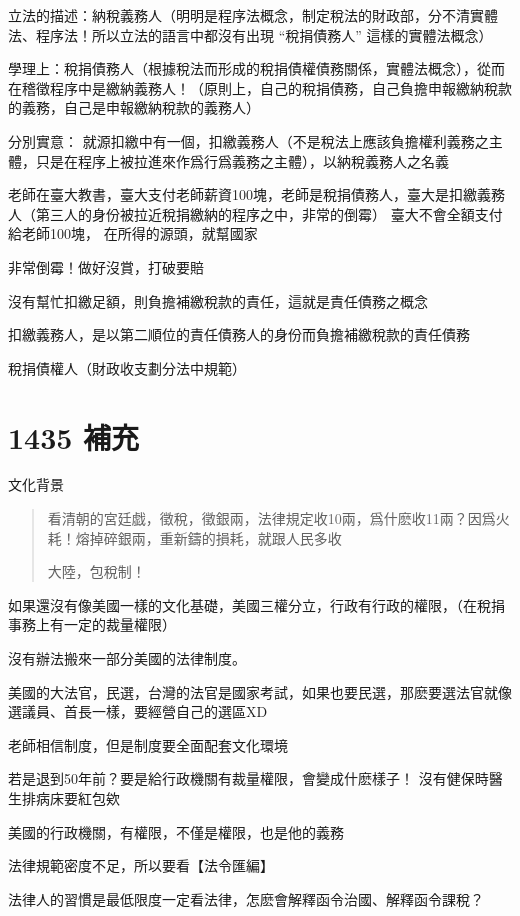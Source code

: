 \documentclass[]{ctexbook}
\begin{document}
立法的描述：納稅義務人（明明是程序法概念，制定稅法的財政部，分不清實體法、程序法！所以立法的語言中都沒有出現 ``稅捐債務人'' 這樣的實體法概念）

學理上：稅捐債務人（根據稅法而形成的稅捐債權債務關係，實體法概念），從而在稽徵程序中是繳納義務人！（原則上，自己的稅捐債務，自己負擔申報繳納稅款的義務，自己是申報繳納稅款的義務人）

分別實意：
就源扣繳中有一個，扣繳義務人（不是稅法上應該負擔權利義務之主體，只是在程序上被拉進來作爲行爲義務之主體），以納稅義務人之名義

老師在臺大教書，臺大支付老師薪資100塊，老師是稅捐債務人，臺大是扣繳義務人（第三人的身份被拉近稅捐繳納的程序之中，非常的倒霉）
臺大不會全額支付給老師100塊，
在所得的源頭，就幫國家

非常倒霉！做好沒賞，打破要賠

沒有幫忙扣繳足額，則負擔補繳稅款的責任，這就是責任債務之概念

扣繳義務人，是以第二順位的責任債務人的身份而負擔補繳稅款的責任債務

稅捐債權人（財政收支劃分法中規範）

\hypertarget{ux88dcux5145}{%
\section{1435 補充}\label{ux88dcux5145}}

文化背景

\begin{quote}
看清朝的宮廷戯，徵稅，徵銀兩，法律規定收10兩，爲什麽收11兩？因爲火耗！熔掉碎銀兩，重新鑄的損耗，就跟人民多收

大陸，包稅制！
\end{quote}

如果還沒有像美國一樣的文化基礎，美國三權分立，行政有行政的權限，（在稅捐事務上有一定的裁量權限）

沒有辦法搬來一部分美國的法律制度。

美國的大法官，民選，台灣的法官是國家考試，如果也要民選，那麽要選法官就像選議員、首長一樣，要經營自己的選區XD

老師相信制度，但是制度要全面配套文化環境

若是退到50年前？要是給行政機關有裁量權限，會變成什麽樣子！
沒有健保時醫生排病床要紅包欸

美國的行政機關，有權限，不僅是權限，也是他的義務

法律規範密度不足，所以要看【法令匯編】

法律人的習慣是最低限度一定看法律，怎麽會解釋函令治國、解釋函令課稅？
\end{document}
